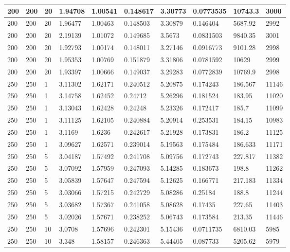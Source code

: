 \begin{landscape}
\begin{longtable}{ | l | l | l | l | l | l | l | l | l | l | }
200 & 200 & 20 & 1.94708 & 1.00541 & 0.148617 & 3.30773 & 0.0773535 & 10743.3 & 3000\\ \hline
200 & 200 & 20 & 1.96477 & 1.00463 & 0.148503 & 3.30879 & 0.146404 & 5687.92 & 2992\\ \hline
200 & 200 & 20 & 2.19139 & 1.01072 & 0.149685 & 3.5673 & 0.0831503 & 9840.35 & 3001\\ \hline
200 & 200 & 20 & 1.92793 & 1.00174 & 0.148011 & 3.27146 & 0.0916773 & 9101.28 & 2998\\ \hline
200 & 200 & 20 & 1.95353 & 1.00769 & 0.151879 & 3.31806 & 0.0781592 & 10629 & 2999\\ \hline
200 & 200 & 20 & 1.93397 & 1.00666 & 0.149037 & 3.29283 & 0.0772839 & 10769.9 & 2998\\ \hline
250 & 250 & 1 & 3.11302 & 1.62171 & 0.240512 & 5.20875 & 0.174243 & 186.567 & 11146\\ \hline
250 & 250 & 1 & 3.14758 & 1.62452 & 0.24712 & 5.26296 & 0.181524 & 183.95 & 11020\\ \hline
250 & 250 & 1 & 3.13043 & 1.62428 & 0.24248 & 5.23326 & 0.172417 & 185.7 & 11099\\ \hline
250 & 250 & 1 & 3.11125 & 1.62105 & 0.240884 & 5.20914 & 0.253531 & 184.15 & 10983\\ \hline
250 & 250 & 1 & 3.1169 & 1.6236 & 0.242617 & 5.21928 & 0.173831 & 186.2 & 11125\\ \hline
250 & 250 & 1 & 3.09627 & 1.62571 & 0.239014 & 5.19563 & 0.175484 & 186.633 & 11171\\ \hline
250 & 250 & 5 & 3.04187 & 1.57492 & 0.241708 & 5.09756 & 0.172743 & 227.817 & 11382\\ \hline
250 & 250 & 5 & 3.07092 & 1.57959 & 0.247093 & 5.14285 & 0.183673 & 198.8 & 11262\\ \hline
250 & 250 & 5 & 3.05839 & 1.57647 & 0.247594 & 5.12625 & 0.166771 & 217.183 & 11334\\ \hline
250 & 250 & 5 & 3.03066 & 1.57215 & 0.242729 & 5.08286 & 0.25184 & 188.8 & 11244\\ \hline
250 & 250 & 5 & 3.03682 & 1.57367 & 0.241058 & 5.08628 & 0.17435 & 227.65 & 11403\\ \hline
250 & 250 & 5 & 3.02026 & 1.57671 & 0.238252 & 5.06743 & 0.173584 & 213.35 & 11446\\ \hline
250 & 250 & 10 & 3.0708 & 1.57696 & 0.242301 & 5.15436 & 0.0711735 & 6810.03 & 5985\\ \hline
250 & 250 & 10 & 3.348 & 1.58157 & 0.246363 & 5.44405 & 0.087733 & 5205.62 & 5979\\ \hline

\end{longtable}
\end{landscape}
